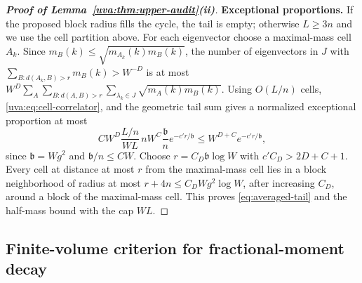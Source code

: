 \documentclass[11pt]{article}
\numberwithin{equation}{section}
\theoremstyle{remark}
\begin{document}
\begin{proof}[\textbf{Proof of Lemma~\ref{uva:thm:upper-audit}\textup{(ii)}}]
\medskip\noindent\textbf{Exceptional proportions.}
If the proposed block radius fills the cycle, the tail is empty;
otherwise $L\ge3n$ and we use the cell partition above.
For each eigenvector choose a maximal-mass cell $A_k$.
Since $m_B(k)\le\sqrt{m_{A_k}(k)m_B(k)}$, the number of eigenvectors
in $J$ with $\sum_{B:d(A_k,B)>r}m_B(k)>W^{-D}$ is at most
$W^D\sum_A\sum_{B:d(A,B)>r}\sum_{\lambda_k\in J}\sqrt{m_A(k)m_B(k)}$.
Using $O(L/n)$ cells, \eqref{uva:eq:cell-correlator}, and the geometric
tail sum gives a normalized exceptional proportion at most
\[
 C W^D\frac{L/n}{WL}\,nW^C\frac{\mathfrak b}{n}
       e^{-c'r/\mathfrak b}
 \le W^{D+C}e^{-c'r/\mathfrak b},
\]
since $\mathfrak b=Wg^2$ and $\mathfrak b/n\le CW$.
Choose $r=C_D\mathfrak b\log W$ with $c'C_D>2D+C+1$.
Every cell at distance at most $r$ from the maximal-mass cell lies
in a block neighborhood of radius at most $r+4n\le C_DWg^2\log W$, after increasing $C_D$, around a block
of the maximal-mass cell. This proves \eqref{eq:averaged-tail}
and the half-mass bound with the cap $WL$.
\end{proof}

\subsection{Finite-volume criterion for fractional-moment decay}
\label{app:finite-volume-criterion}
\end{document}
